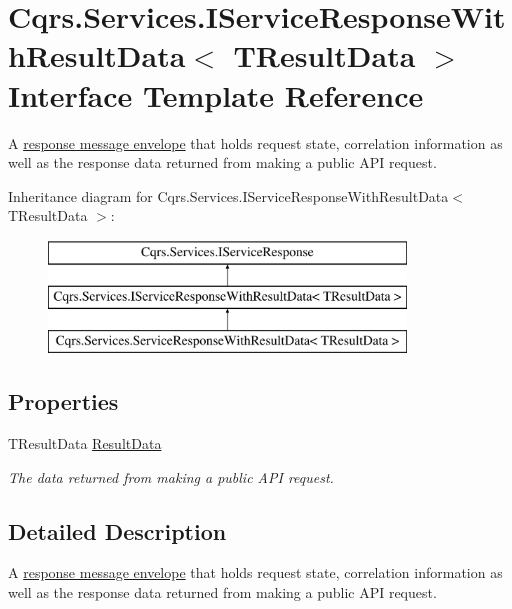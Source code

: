 \hypertarget{interfaceCqrs_1_1Services_1_1IServiceResponseWithResultData}{}\section{Cqrs.\+Services.\+I\+Service\+Response\+With\+Result\+Data$<$ T\+Result\+Data $>$ Interface Template Reference}
\label{interfaceCqrs_1_1Services_1_1IServiceResponseWithResultData}


A \hyperlink{interfaceCqrs_1_1Services_1_1IServiceResponse}{response message envelope} that holds request state, correlation information as well as the response data returned from making a public A\+PI request.  


Inheritance diagram for Cqrs.\+Services.\+I\+Service\+Response\+With\+Result\+Data$<$ T\+Result\+Data $>$\+:\begin{figure}[H]
\begin{center}
\leavevmode
\includegraphics[height=3.000000cm]{interfaceCqrs_1_1Services_1_1IServiceResponseWithResultData}
\end{center}
\end{figure}
\subsection*{Properties}
\begin{DoxyCompactItemize}
\item 
T\+Result\+Data \hyperlink{interfaceCqrs_1_1Services_1_1IServiceResponseWithResultData_a9cca2c2341cc95f3c55fb2058c240dd1}{Result\+Data}
\begin{DoxyCompactList}\small\item\em The data returned from making a public A\+PI request. \end{DoxyCompactList}\end{DoxyCompactItemize}


\subsection{Detailed Description}
A \hyperlink{interfaceCqrs_1_1Services_1_1IServiceResponse}{response message envelope} that holds request state, correlation information as well as the response data returned from making a public A\+PI request. 



